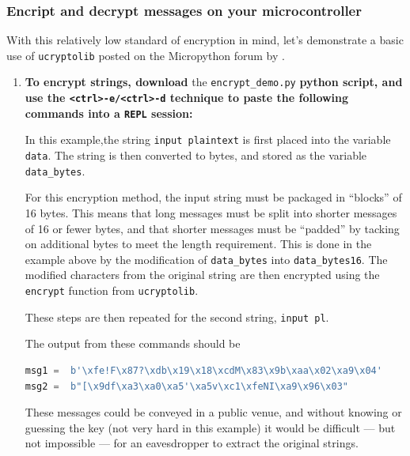 \subsubsection{\howto Encript and decrypt messages on your microcontroller}
With this relatively low standard of encryption in mind, let's demonstrate a basic use of \lstinline{ucryptolib} posted on the Micropython forum by .
\begin{enumerate}
	\item \textbf{To encrypt strings, download} the \lstinline{encrypt_demo.py} \textbf{python script, and use the \lstinline{<ctrl>-e/<ctrl>-d} technique to paste the following commands into a \texttt{REPL} session:}


	In this example,the string \texttt{input plaintext} is first placed into the variable \lstinline{data}.
	The string is then converted to bytes, and stored as the variable \lstinline{data_bytes}.

	\smallskip
	For this encryption method, the input string must be packaged in ``blocks'' of 16 bytes.
	This means that long messages must be split into shorter messages of 16 or fewer bytes, and that shorter messages must be ``padded'' by tacking on additional bytes to meet the length requirement.
	This is done in the example above by the modification of \lstinline{data_bytes} into \lstinline{data_bytes16}.
	The modified characters from the original string are then encrypted using the \lstinline{encrypt} function from \lstinline{ucryptolib}.
	
	\smallskip
	These steps are then repeated for the second string, \texttt{input pl}.

	The output from these commands should be
\begin{lstlisting}[language=Python]
msg1 =  b'\xfe!F\x87?\xdb\x19\x18\xcdM\x83\x9b\xaa\x02\xa9\x04'
msg2 =  b"[\x9df\xa3\xa0\xa5'\xa5v\xc1\xfeNI\xa9\x96\x03"
\end{lstlisting}
	These messages could be conveyed in a public venue, and without knowing or guessing the key (not very hard in this example) it would be difficult --- but not impossible --- for an eavesdropper to extract the original strings.


\end{enumerate}
